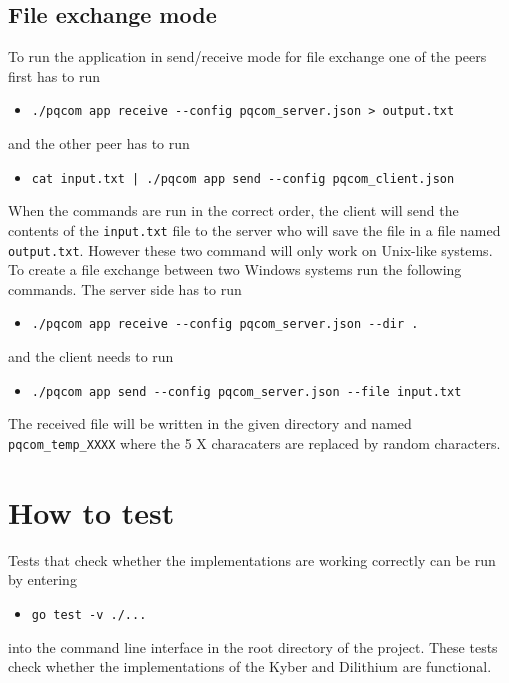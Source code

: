 \subsection{File exchange mode}
To run the application in send/receive mode for file exchange one of the peers first has to run
\begin{itemize}
  \item \texttt{./pqcom app receive -\--config pqcom\_server.json > output.txt}
\end{itemize}
and the other peer has to run
\begin{itemize}
  \item \texttt{cat input.txt | ./pqcom app send -\--config pqcom\_client.json}
\end{itemize}
When the commands are run in the correct order, the client will send the contents of the \texttt{input.txt} file to the server who will save the file in a file named \texttt{output.txt}. However these two command will only work on Unix-like systems. To create a file exchange between two Windows systems run the following commands. The server side has to run
\begin{itemize}
  \item \texttt{./pqcom app receive -\--config pqcom\_server.json -\--dir .}
\end{itemize}
and the client needs to run
\begin{itemize}
  \item \texttt{./pqcom app send -\--config pqcom\_server.json -\--file input.txt}
\end{itemize}
The received file will be written in the given directory and named \texttt{pqcom\_temp\_XXXX} where the 5 X characaters are replaced by random characters.

\section{How to test}
Tests that check whether the implementations are working correctly can be run by entering
\begin{itemize}
  \item \texttt{go test -v ./...}
\end{itemize}
into the command line interface in the root directory of the project. These tests check whether the implementations of the Kyber and Dilithium are functional.

